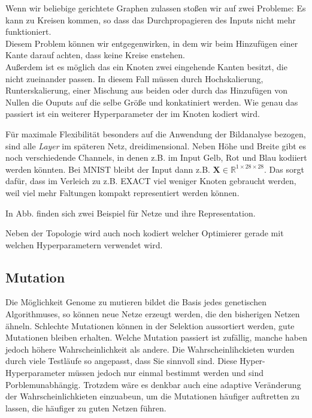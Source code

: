 \documentclass[]{scrartcl}
\begin{document}
			Wenn wir beliebige gerichtete Graphen zulassen stoßen wir auf zwei Probleme:
			Es kann zu Kreisen kommen, so dass das Durchpropagieren des Inputs nicht mehr funktioniert. \\
			Diesem Problem können wir entgegenwirken, in dem wir beim Hinzufügen einer Kante darauf achten, dass keine Kreise enstehen. \\
			Außerdem ist es möglich das ein Knoten zwei eingehende Kanten besitzt, die nicht zueinander passen.
			In diesem Fall müssen durch Hochskalierung, Runterskalierung, einer Mischung aus beiden oder durch das Hinzufügen von Nullen die 
			Ouputs auf die selbe Größe und konkatiniert werden. Wie genau das passiert ist ein weiterer Hyperparameter der im Knoten kodiert wird.

			Für maximale Flexibilität besonders auf die Anwendung der Bildanalyse bezogen, sind alle \textit{Layer} im späteren Netz, dreidimensional.
			Neben Höhe und Breite gibt es noch verschiedende Channels, in denen z.B. im Input Gelb, Rot und Blau kodiiert werden könnten.
			Bei MNIST bleibt der Input dann z.B. $\mathbf{X} \in \mathbb{R}^{1 \times 28 \times 28}$.
			Das sorgt dafür, dass im Verleich zu z.B. EXACT \cite{exact} viel weniger Knoten gebraucht werden, weil viel mehr Faltungen kompakt
			representiert werden können.

			In Abb. finden sich zwei Beispiel für Netze und ihre Representation.


			Neben der Topologie wird auch noch kodiert welcher Optimierer gerade mit welchen Hyperparametern verwendet wird.

		\subsection{Mutation}

			Die Möglichkeit Genome zu mutieren bildet die Basis jedes genetischen Algorithmuses, so können neue Netze erzeugt werden, die den
			bisherigen Netzen ähneln. Schlechte Mutationen können in der Selektion aussortiert werden, gute Mutationen bleiben erhalten.
			Welche Mutation passiert ist zufällig, manche haben jedoch höhere Wahrscheinlichkeit als andere.
			Die Wahrscheinlihckieten wurden durch viele Testläufe so angepasst, dass Sie sinnvoll sind.
			Diese Hyper-Hyperparameter müssen jedoch nur einmal bestimmt werden und sind Porblemunabhängig.
			Trotzdem wäre es denkbar auch eine adaptive Veränderung der Wahrscheinlichkieten einzuabeun, um die Mutationen häufiger auftretten zu lassen,
			die häufiger zu guten Netzen führen.
\end{document}
